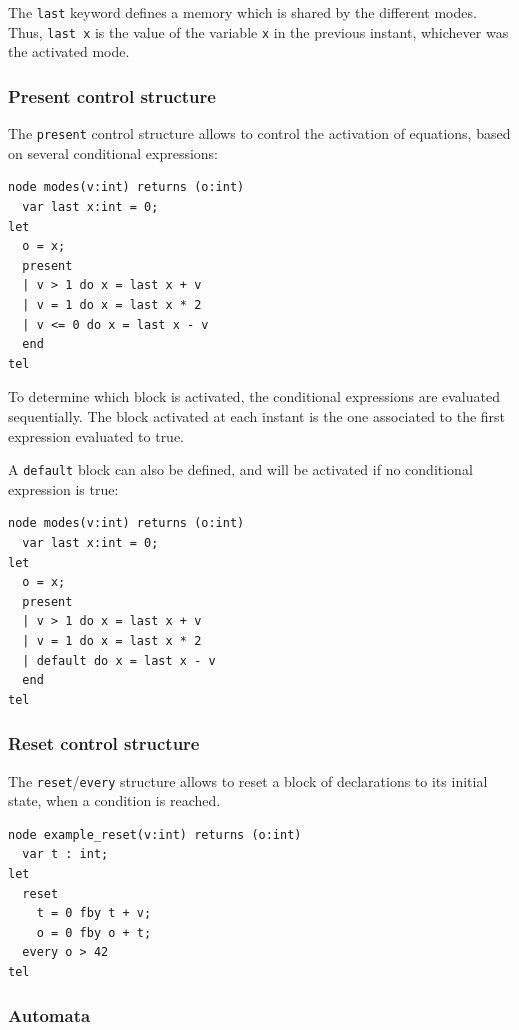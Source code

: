 \documentclass[a4paper]{article}
\begin{document}
The \texttt{last} keyword defines a memory which is shared by the different
modes. Thus, \lstinline|last x| is the value of the variable \texttt{x} in the
previous instant, whichever was the activated mode.

\subsubsection{Present control structure}
\label{sec:present}

The \lstinline{present} control structure allows to control the
activation of equations, based on several conditional expressions:

\begin{lstlisting}
node modes(v:int) returns (o:int)
  var last x:int = 0;
let
  o = x;
  present
  | v > 1 do x = last x + v
  | v = 1 do x = last x * 2
  | v <= 0 do x = last x - v
  end
tel
\end{lstlisting}

To determine which block is activated, the conditional expressions are
evaluated sequentially. The block activated at each instant is the one
associated to the first expression evaluated to true.

A \lstinline{default} block can also be defined, and will be activated
if no conditional expression is true:

\begin{lstlisting}
node modes(v:int) returns (o:int)
  var last x:int = 0;
let
  o = x;
  present
  | v > 1 do x = last x + v
  | v = 1 do x = last x * 2
  | default do x = last x - v
  end
tel
\end{lstlisting}

\subsubsection{Reset control structure}
\label{sec:reset}

The \lstinline{reset}/\lstinline{every} structure allows to reset a
block of declarations to its initial state, when a condition is
reached.

\begin{lstlisting}
node example_reset(v:int) returns (o:int)
  var t : int;
let
  reset
    t = 0 fby t + v;
    o = 0 fby o + t;
  every o > 42
tel
\end{lstlisting}

\subsubsection{Automata}
\label{sec:automata}
\end{document}
